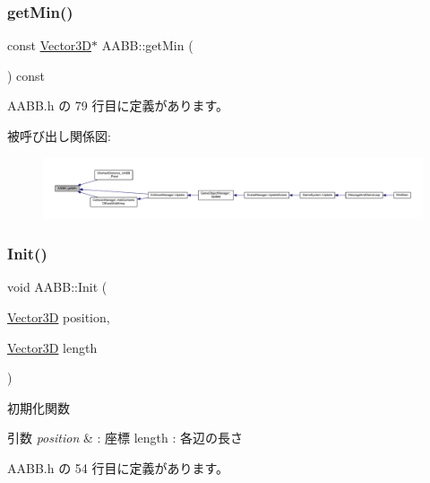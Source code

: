 \subsubsection{\texorpdfstring{get\+Min()}{getMin()}}
{\footnotesize\ttfamily const \mbox{\hyperlink{class_vector3_d}{Vector3D}}$\ast$ A\+A\+B\+B\+::get\+Min (\begin{DoxyParamCaption}{ }\end{DoxyParamCaption}) const\hspace{0.3cm}{\ttfamily [inline]}}



 A\+A\+B\+B.\+h の 79 行目に定義があります。

被呼び出し関係図\+:
\nopagebreak
\begin{figure}[H]
\begin{center}
\leavevmode
\includegraphics[width=350pt]{class_a_a_b_b_a9a18cef6c33dd579c144700c79ea39f5_icgraph}
\end{center}
\end{figure}
\mbox{\label{class_a_a_b_b_a28167704c3b21de2ae9f70ac139781c4}} 
\subsubsection{\texorpdfstring{Init()}{Init()}}
{\footnotesize\ttfamily void A\+A\+B\+B\+::\+Init (\begin{DoxyParamCaption}\item[{\mbox{\hyperlink{class_vector3_d}{Vector3D}}}]{position,  }\item[{\mbox{\hyperlink{class_vector3_d}{Vector3D}}}]{length }\end{DoxyParamCaption})\hspace{0.3cm}{\ttfamily [inline]}}



初期化関数 


\begin{DoxyParams}{引数}
{\em position} & \+: 座標 length \+: 各辺の長さ \\
\hline
\end{DoxyParams}


 A\+A\+B\+B.\+h の 54 行目に定義があります。

